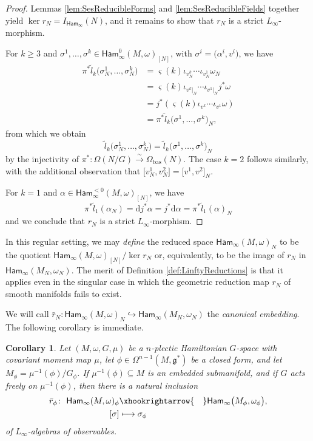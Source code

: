 \documentclass[pdftex]{sigma}
\numberwithin{equation}{section}
\newtheorem{Corollary}[Theorem]{Corollary}
\newcommand{\g}{\mathfrak{g}}
\newcommand{\Ham}{\mathsf{Ham}}
\renewcommand{\subset}{\subseteq}
\renewcommand{\d}{\mathrm{d}}
\begin{document}
\begin{proof}
	Lemmas \ref{lem:SesReducibleForms} and \ref{lem:SesReducibleFields} together yield $\ker r_N=I_{\Ham_\infty}(N)$, and it remains to show that $r_N$ is a strict $L_\infty$-morphism.

	For $k\geq 3$ and $\sigma^1,\dots,\sigma^k \in \Ham_\infty^0(M,\omega)_{[N]}$, with $\sigma^i=\bigl(\alpha^i,v^i\bigr)$, we have
	\begin{align*}
		\pi^* \tilde{l}_k\bigl(\sigma_N^1,\dots,\sigma_N^k\bigr)
			&=	\varsigma(k)  \iota_{v_N^k}\cdots\iota_{v_N^1} \omega_N		\\
		&=	\varsigma(k)  \iota_{v^k|_N}\cdots\iota_{v^1|_N} j^*\omega		\\
		&=	j^*(\varsigma(k)  \iota_{v^k}\cdots\iota_{v^1}\omega)		\\
		&=	\pi^* \tilde{l}_k\bigl(\sigma^1,\dots,\sigma^k\bigr)_N,
	\end{align*}
	from which we obtain
	\[
		\tilde{l}_k\bigl(\sigma_N^1,\dots,\sigma_N^k\bigr) = \tilde{l}_k\bigl(\sigma^1,\dots,\sigma^k\bigr)_N
	\]
	by the injectivity of $\pi^*\colon \Omega(N/G)\xrightarrow{\sim}\Omega_{\mathrm{bas}}(N)$. The case $k=2$ follows similarly, with the additional observation that $\bigl[v_N^1,v_N^2\bigr] = \bigl[v^1,v^2\bigr]_N$.

	For $k=1$ and $\alpha\in\Ham_\infty^{<0}(M,\omega)_{[N]}$, we have
	\[
		\pi^*\tilde{l}_1(\alpha_N) = \d j^*\alpha = j^*\d\alpha = \pi^*\tilde{l}_1(\alpha)_N
	\]
	and we conclude that $r_N$ is a strict $L_\infty$-morphism.
\end{proof}

\begin{Remark}
	In this regular setting, we may \emph{define} the reduced space $\Ham_\infty(M,\omega)_N$ to be the quotient $\Ham_\infty(M,\omega)_{[N]} / \ker r_N$ or, equivalently, to be the image of $r_N$ in $\Ham_\infty(M_N,\omega_N)$. The merit of Definition \ref{def:LinftyReductions} is that it applies even in the singular case in which the geometric reduction map $r_N$ of smooth manifolds fails to exist.
\end{Remark}

We will call $\bar{r}_N\colon \Ham_\infty(M,\omega)_N \hookrightarrow \Ham_\infty(M_N,\omega_N)$ the \emph{canonical embedding}. The following corollary is immediate.

\begin{Corollary}
	Let $(M,\omega,G,\mu)$ be a $n$-plectic Hamiltonian $G$-space with covariant moment map $\mu$, let $\phi\in\Omega^{n-1}(M,\g^*)$ be a closed form, and let $M_\phi= \mu^{-1}(\phi)/G_\phi$. If $\mu^{-1}(\phi)\subset M$ is an embedded submanifold, and if $G$ acts freely on $\mu^{-1}(\phi)$, then there is a natural inclusion
	\begin{align*}
		\bar{r}_\phi\colon \	\Ham_\infty(M,\omega)_\phi	&\xhookrightarrow{\hspace{10pt}}	\Ham_\infty\bigl(M_\phi,\omega_\phi\bigr),	\\
				[\sigma]		&\longmapsto				\sigma_\phi
	\end{align*}
	of $L_\infty$-algebras of observables.
\end{Corollary}
\end{document}
